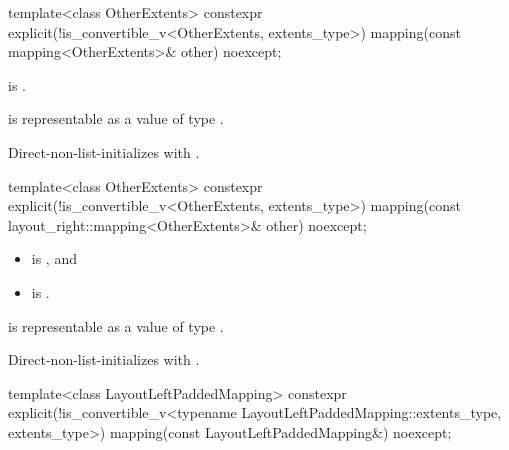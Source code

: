 %
\begin{itemdecl}
template<class OtherExtents>
  constexpr explicit(!is_convertible_v<OtherExtents, extents_type>)
    mapping(const mapping<OtherExtents>& other) noexcept;
\end{itemdecl}

\begin{itemdescr}
\pnum
\constraints
{} is .

\pnum
\expects
{} is representable as
a value of type .

\pnum
\effects
Direct-non-list-initializes  with .
\end{itemdescr}

%
\begin{itemdecl}
template<class OtherExtents>
  constexpr explicit(!is_convertible_v<OtherExtents, extents_type>)
    mapping(const layout_right::mapping<OtherExtents>& other) noexcept;
\end{itemdecl}

\begin{itemdescr}
\pnum
\constraints
\begin{itemize}
\item
{} is , and
\item
{} is .
\end{itemize}

\pnum
\expects
{} is representable as
a value of type .

\pnum
\effects
Direct-non-list-initializes  with .
\end{itemdescr}

%
\begin{itemdecl}
template<class LayoutLeftPaddedMapping>
  constexpr explicit(!is_convertible_v<typename LayoutLeftPaddedMapping::extents_type,
                                       extents_type>)
    mapping(const LayoutLeftPaddedMapping&) noexcept;
\end{itemdecl}

